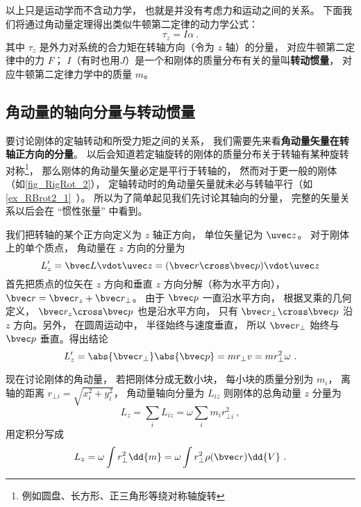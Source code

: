以上只是运动学而不含动力学， 也就是并没有考虑力和运动之间的关系。 下面我们将通过角动量定理得出类似牛顿第二定律的动力学公式：
\begin{equation}
\tau_z = I \alpha~.
\end{equation}
其中 $\tau_z$ 是外力对系统的合力矩在转轴方向（令为 $z$ 轴）的分量， 对应牛顿第二定律中的力 $F$； $I$（有时也用$J$）是一个和刚体的质量分布有关的量叫\textbf{转动惯量}， 对应牛顿第二定律力学中的质量 $m$。

\subsection{角动量的轴向分量与转动惯量}
要讨论刚体的定轴转动和所受力矩之间的关系， 我们需要先来看\textbf{角动量矢量在转轴正方向的分量}。 以后会知道若定轴旋转的刚体的质量分布关于转轴有某种旋转对称\footnote{例如圆盘、长方形、正三角形等绕对称轴旋转}， 那么刚体的角动量矢量必定是平行于转轴的， 然而对于更一般的刚体（如\autoref{fig_RigRot_2}）， 定轴转动时的角动量矢量就未必与转轴平行（如\autoref{ex_RBrot2_1}~）。 所以为了简单起见我们先讨论其轴向的分量， 完整的矢量关系以后会在 “惯性张量” 中看到。

我们把转轴的某个正方向定义为 $z$ 轴正方向， 单位矢量记为 $\uvec z$。 对于刚体上的单个质点， 角动量在 $z$ 方向的分量为
\begin{equation}
L'_{z} = \bvec L \vdot \uvec z = (\bvec r \cross \bvec p) \vdot \uvec z
\end{equation}
首先把质点的位矢在 $z$ 方向和垂直 $z$ 方向分解（称为水平方向）， $\bvec r = \bvec r_z + \bvec r_ \bot$。 由于 $\bvec p$ 一直沿水平方向， 根据叉乘的几何定义， $\bvec r_z \cross \bvec p$ 也是沿水平方向， 只有 $\bvec r_ \bot \cross \bvec p$ 沿 $z$ 方向。另外， 在圆周运动中， 半径始终与速度垂直， 所以 $\bvec r_ \bot$ 始终与 $\bvec p$ 垂直。得出结论
\begin{equation}
L'_z = \abs{\bvec r_\bot} \abs{\bvec p} = m r_ \bot v = mr_ \bot ^2\omega ~.
\end{equation}

现在讨论刚体的角动量， 若把刚体分成无数小块， 每小块的质量分别为 $m_i$， 离轴的距离 $r_{\bot i} = \sqrt{x_i^2 + y_i^2} $， 角动量轴向分量为 $L_{iz}$ 则刚体的总角动量 $z$ 分量为
\begin{equation}
L_z = \sum_i L_{iz} = \omega \sum_i m_i r_{ \bot i}^2~,
\end{equation}
用定积分写成
\begin{equation}
L_z = \omega \int r_ \bot ^2 \dd{m} = \omega \int r_ \bot ^2\rho(\bvec r)  \dd{V} ~.
\end{equation}

